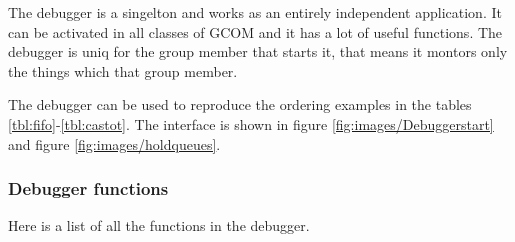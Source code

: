 \documentclass[titlepage, twocolumn, a4paper, 10pt]{article}
\begin{document}

The debugger is a singelton and works as an entirely independent
application. It can be activated in all classes of GCOM and it has a
lot of useful functions. The debugger is uniq for the group member
that starts it, that means it montors only the things which that group
member.

The debugger can be used to reproduce the ordering examples in the
tables \ref{tbl:fifo}-\ref{tbl:castot}. The interface is shown in
figure \vref{fig:images/Debuggerstart} and figure
\vref{fig:images/holdqueues}.

\subsubsection{Debugger functions}\label{sec:debuggerfunctions}
Here is a list of all the functions in the debugger.
\end{document}
